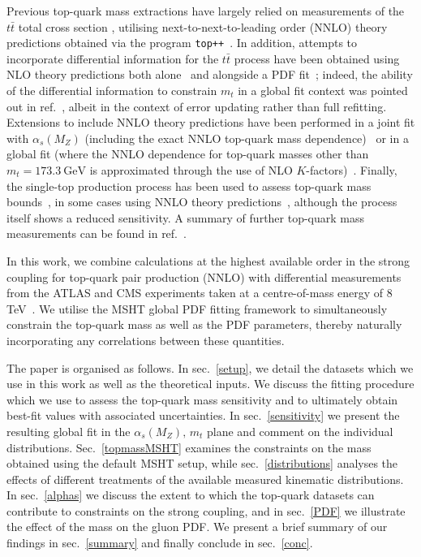 \documentclass[sn-mathphys]{sn-jnl}%
\newcommand{\mt}{m_t}
\newcommand{\as}{\alpha_s(M_Z)}
\begin{document}
Previous top-quark mass extractions have largely relied on measurements of the $t\bar{t}$ total cross section \cite{ATLAS:2014nxi,CMS:2016yys,CMS:2018fks}, utilising next-to-next-to-leading order (NNLO) theory predictions obtained via the program \texttt{top++}~\cite{Czakon:2011xx,Czakon:2013goa}. In addition, attempts to incorporate differential information for the $t\bar{t}$ process have been obtained using NLO theory predictions both alone~\cite{CDF:2014upy,ATLAS:2018fwq, CMS:2018tye,Gombas:2022zbh,ATLAS:2022jbw,ATLAS:2022jpn} and alongside a PDF fit~\cite{Guzzi:2014wia,CMS:2019esx}; indeed, the ability of the differential information to constrain $\mt$ in a global fit context was pointed out in ref.~\cite{Kadir:2020yml}, albeit in the context of error updating rather than full refitting. Extensions to include NNLO theory predictions have been performed in a joint fit with $\as$ (including the exact NNLO top-quark mass dependence)~\cite{Cooper-Sarkar:2020twv} or in a global fit (where the NNLO dependence for top-quark masses other than $\mt=173.3~\mathrm{GeV}$ is approximated through the use of NLO $K$-factors)~\cite{Gao:2022srd}. Finally, the single-top production process has been used to assess top-quark mass bounds~\cite{Alekhin:2016jjz,CMS:2017mpr}, in some cases using NNLO theory predictions~\cite{Gao:2020nhu}, although the process itself shows a reduced sensitivity. A summary of further top-quark mass measurements can be found in ref.~\cite{Schwienhorst:2022yqu}.

In this work, we combine calculations at the highest available order in the strong coupling for top-quark pair production (NNLO) with differential measurements from the ATLAS and CMS experiments taken at a centre-of-mass energy of 8 TeV~\cite{ATLAS:2015lsn,CMS:2015rld}. We utilise the MSHT global PDF fitting framework to simultaneously constrain the top-quark mass as well as the PDF parameters, thereby naturally incorporating any correlations between these quantities. 

The paper is organised as follows. In sec.~\ref{setup}, we detail the datasets which we use in this work as well as the theoretical inputs. We discuss the fitting procedure which we use to assess the top-quark mass sensitivity and to ultimately obtain best-fit values with associated uncertainties. In sec.~\ref{sensitivity} we present the resulting global fit in the $\as,\,\mt$ plane and comment on the individual distributions. Sec.~\ref{topmassMSHT} examines the constraints on the mass obtained using the default MSHT setup, while sec.~\ref{distributions} analyses the effects of different treatments of the available measured kinematic distributions. In sec.~\ref{alphas} we discuss the extent to which the top-quark datasets can contribute to constraints on the strong coupling, and in sec.~\ref{PDF} we illustrate the effect of the mass on the gluon PDF. We present a brief summary of our findings in sec.~\ref{summary} and finally conclude in sec.~\ref{conc}.
\end{document}
